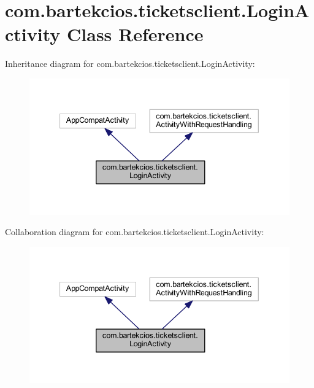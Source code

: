 \hypertarget{classcom_1_1bartekcios_1_1ticketsclient_1_1_login_activity}{}\section{com.\+bartekcios.\+ticketsclient.\+Login\+Activity Class Reference}
\label{classcom_1_1bartekcios_1_1ticketsclient_1_1_login_activity}


Inheritance diagram for com.\+bartekcios.\+ticketsclient.\+Login\+Activity\+:
\nopagebreak
\begin{figure}[H]
\begin{center}
\leavevmode
\includegraphics[width=340pt]{classcom_1_1bartekcios_1_1ticketsclient_1_1_login_activity__inherit__graph}
\end{center}
\end{figure}


Collaboration diagram for com.\+bartekcios.\+ticketsclient.\+Login\+Activity\+:
\nopagebreak
\begin{figure}[H]
\begin{center}
\leavevmode
\includegraphics[width=340pt]{classcom_1_1bartekcios_1_1ticketsclient_1_1_login_activity__coll__graph}
\end{center}
\end{figure}
